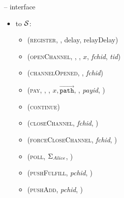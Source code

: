 \begin{figure}[H]
\begin{systembox}{\fpaynet{} -- interface}
\begin{itemize}
        \begin{itemize}
          \item (\textsc{registerDone}, \alice, pubKey)
          \item (\textsc{corrupted}, \alice)
          \item (\textsc{channelAnnounced}, \alice, $p_{\alice, F}, p_{\bob,
          F}$, \textit{fchid}, \textit{pchid}, \textit{tid})
          \item (, \texttt{receipt}, \alice)
          \item {}
          \item (\textsc{closedChannel}, \texttt{channel}, \alice)
          \item (\textsc{resolvePays}, \texttt{charged})
          \item {}
          \item {}
        \end{itemize}
        \item to $\mathcal{S}$:
        \begin{itemize}
          \item (\textsc{register}, \alice, delay, relayDelay)
          \item (\textsc{openChannel}, \alice, \bob, $x$, \textit{fchid},
          \textit{tid})
          \item (\textsc{channelOpened}, \alice, \textit{fchid})
          \item (\textsc{pay}, \alice, \bob, $x,
          \overrightarrow{\mathtt{path}}$, ,
          \textit{payid}, )
          \item (\textsc{continue})
          \item (\textsc{closeChannel}, \textit{fchid}, \alice)
          \item (\textsc{forceCloseChannel}, \textit{fchid}, \alice)
          \item (\textsc{poll}, $\Sigma_{\mathit{Alice}}$, \alice)
          \item (\textsc{pushFulfill}, \textit{pchid}, \alice)
          \item (\textsc{pushAdd}, \textit{pchid}, \alice)

\end{itemize}
\end{itemize}
\end{systembox}
\end{figure}
